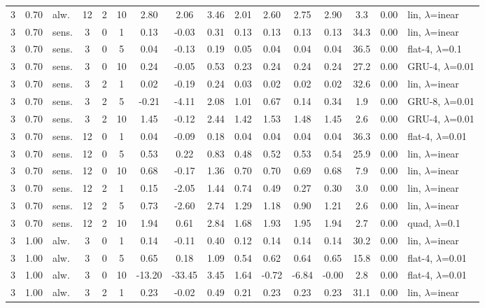 \begin{scriptsize}
\begin{longtable}{cclcc c ccc ccc c cc l}
3 & 0.70 & alw. & 12 & 2 & 10 & 2.80 & 2.06 & 3.46 & 2.01 & 2.60 & 2.75 & 2.90 & 3.3 & 0.00 & lin, $\lambda$=inear \\
3 & 0.70 & sens. & 3 & 0 & 1 & 0.13 & -0.03 & 0.31 & 0.13 & 0.13 & 0.13 & 0.13 & 34.3 & 0.00 & lin, $\lambda$=inear \\
3 & 0.70 & sens. & 3 & 0 & 5 & 0.04 & -0.13 & 0.19 & 0.05 & 0.04 & 0.04 & 0.04 & 36.5 & 0.00 & flat-4, $\lambda$=0.1 \\
3 & 0.70 & sens. & 3 & 0 & 10 & 0.24 & -0.05 & 0.53 & 0.23 & 0.24 & 0.24 & 0.24 & 27.2 & 0.00 & GRU-4, $\lambda$=0.01 \\
3 & 0.70 & sens. & 3 & 2 & 1 & 0.02 & -0.19 & 0.24 & 0.03 & 0.02 & 0.02 & 0.02 & 32.6 & 0.00 & lin, $\lambda$=inear \\
3 & 0.70 & sens. & 3 & 2 & 5 & -0.21 & -4.11 & 2.08 & 1.01 & 0.67 & 0.14 & 0.34 & 1.9 & 0.00 & GRU-8, $\lambda$=0.01 \\
3 & 0.70 & sens. & 3 & 2 & 10 & 1.45 & -0.12 & 2.44 & 1.42 & 1.53 & 1.48 & 1.45 & 2.6 & 0.00 & GRU-4, $\lambda$=0.01 \\
3 & 0.70 & sens. & 12 & 0 & 1 & 0.04 & -0.09 & 0.18 & 0.04 & 0.04 & 0.04 & 0.04 & 36.3 & 0.00 & flat-4, $\lambda$=0.01 \\
3 & 0.70 & sens. & 12 & 0 & 5 & 0.53 & 0.22 & 0.83 & 0.48 & 0.52 & 0.53 & 0.54 & 25.9 & 0.00 & lin, $\lambda$=inear \\
3 & 0.70 & sens. & 12 & 0 & 10 & 0.68 & -0.17 & 1.36 & 0.70 & 0.70 & 0.69 & 0.68 & 7.9 & 0.00 & lin, $\lambda$=inear \\
3 & 0.70 & sens. & 12 & 2 & 1 & 0.15 & -2.05 & 1.44 & 0.74 & 0.49 & 0.27 & 0.30 & 3.0 & 0.00 & lin, $\lambda$=inear \\
3 & 0.70 & sens. & 12 & 2 & 5 & 0.73 & -2.60 & 2.74 & 1.29 & 1.18 & 0.90 & 1.21 & 2.6 & 0.00 & lin, $\lambda$=inear \\
3 & 0.70 & sens. & 12 & 2 & 10 & 1.94 & 0.61 & 2.84 & 1.68 & 1.93 & 1.95 & 1.94 & 2.7 & 0.00 & quad, $\lambda$=0.1 \\
3 & 1.00 & alw. & 3 & 0 & 1 & 0.14 & -0.11 & 0.40 & 0.12 & 0.14 & 0.14 & 0.14 & 30.2 & 0.00 & lin, $\lambda$=inear \\
3 & 1.00 & alw. & 3 & 0 & 5 & 0.65 & 0.18 & 1.09 & 0.54 & 0.62 & 0.64 & 0.65 & 15.8 & 0.00 & flat-4, $\lambda$=0.01 \\
3 & 1.00 & alw. & 3 & 0 & 10 & -13.20 & -33.45 & 3.45 & 1.64 & -0.72 & -6.84 & -0.00 & 2.8 & 0.00 & flat-4, $\lambda$=0.01 \\
3 & 1.00 & alw. & 3 & 2 & 1 & 0.23 & -0.02 & 0.49 & 0.21 & 0.23 & 0.23 & 0.23 & 31.1 & 0.00 & lin, $\lambda$=inear \\

\end{longtable}
\end{scriptsize}
